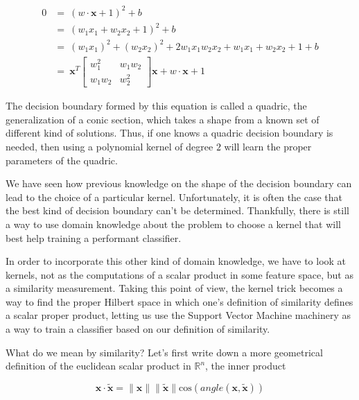 \begin{equation*}
  \begin{aligned}
    0 &=\ \left(w \cdot \mathbf{x} + 1\right)^2 + b\\
      &=\ \left(w_1x_1 + w_2x_2 + 1\right)^2 + b\\
      &=\ (w_1x_1)^2 + (w_2x_2)^2 + 2w_1x_1w_2x_2 + w_1x_1 + w_2x_2 + 1 + b\\
      &=\ \mathbf{x}^T\begin{bmatrix}w_1^2 & w_1w_2\\ w_1w_2 & w_2^2\end{bmatrix}\mathbf{x} + w \cdot \mathbf{x} + 1 
  \end{aligned}
\end{equation*}

The decision boundary formed by this equation is called a quadric, the generalization of a conic section, which takes a shape from a known set of different kind of solutions. Thus, if one knows a quadric decision boundary is needed, then using a polynomial kernel of degree $2$ will learn the proper parameters of the quadric.

We have seen how previous knowledge on the shape of the decision boundary can lead to the choice of a particular kernel. Unfortunately, it is often the case that the best kind of decision boundary can't be determined. Thankfully, there is still a way to use domain knowledge about the problem to choose a kernel that will best help training a performant classifier.


In order to incorporate this other kind of domain knowledge, we have to look at kernels, not as the computations of a scalar product in some feature space, but as a similarity measurement. Taking this point of view, the kernel trick becomes a way to find the proper Hilbert space in which one's definition of similarity defines a scalar proper product, letting us use the Support Vector Machine machinery as a way to train a classifier based on our definition of similarity.

What do we mean by similarity? Let's first write down a more geometrical  definition of the euclidean scalar product in $\mathbb{R}^n$, the inner product 

\begin{equation*}
  \mathbf{x} \cdot \mathbf{\tilde{x}} = \|\mathbf{x}\|\|\mathbf{\tilde{x}}\|\text{cos}\left(angle\left(\mathbf{x}, \mathbf{\tilde{x}}\right)
  \right)
\end{equation*}


